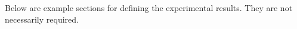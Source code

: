 \label{chap:experiments_results}
Below are example sections for defining the experimental results. They are not necessarily required.